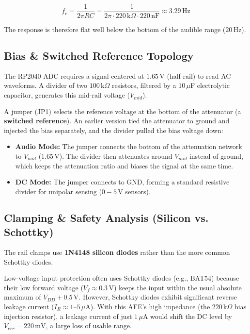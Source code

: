 \documentclass[11pt, a4paper]{report}
\begin{document}
\begin{equation}
  f_c = \frac{1}{2\pi R C} = \frac{1}{2\pi \cdot 220\,\text{k}\Omega \cdot 220\,\text{nF}} \approx 3.29\,\text{Hz}
\end{equation}

The response is therefore flat well below the bottom of the audible range ($20\,\text{Hz}$).

\subsection{Bias \& Switched Reference Topology}
The RP2040 ADC requires a signal centered at $1.65\,\text{V}$ (half-rail) to read AC waveforms.\cite{rpi_rp2040_datasheet} A divider of two $100\,\text{k}\Omega$ resistors, filtered by a $10\,\mu$F electrolytic capacitor, generates this mid-rail voltage ($V_{mid}$).

A jumper (JP1) selects the reference voltage at the bottom of the attenuator (a \textbf{switched reference}). An earlier version tied the attenuator to ground and injected the bias separately, and the divider pulled the bias voltage down:
\begin{itemize}
  \item \textbf{Audio Mode:} The jumper connects the bottom of the attenuation network to $V_{mid}$ ($1.65\,\text{V}$). The divider then attenuates around $V_{mid}$ instead of ground, which keeps the attenuation ratio and biases the signal at the same time.
  \item \textbf{DC Mode:} The jumper connects to GND, forming a standard resistive divider for unipolar sensing ($0-5\,\text{V}$ sensors).
\end{itemize}

\subsection{Clamping \& Safety Analysis (Silicon vs. Schottky)}
The rail clamps use \textbf{1N4148 silicon diodes} rather than the more common Schottky diodes.

Low-voltage input protection often uses Schottky diodes (e.g., BAT54) because their low forward voltage ($V_f \approx 0.3\,\text{V}$) keeps the input within the usual absolute maximum of $V_{DD} + 0.5\,\text{V}$.\cite{nexperia_bat54_datasheet} However, Schottky diodes exhibit significant reverse leakage current ($I_R \approx 1\text{--}5\,\mu\text{A}$).\cite{nexperia_bat54_datasheet} With this AFE's high impedance (the $220\,\text{k}\Omega$ bias injection resistor), a leakage current of just $1\,\mu\text{A}$ would shift the DC level by $V_{err} = 220\,\text{mV}$, a large loss of usable range.
\end{document}
